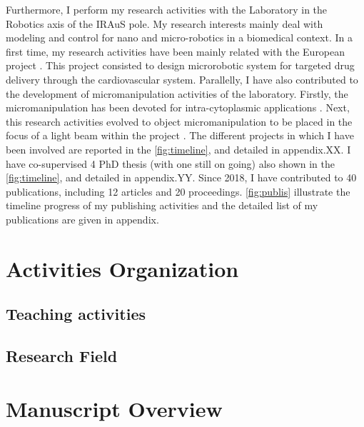 Furthermore, I perform my research activities with the \PRISMEfoot  Laboratory in the Robotics axis of the IRAuS pole.
My research interests mainly deal with modeling and control for nano and micro-robotics in a biomedical context.
In a first time, my research activities have been mainly related with the European project \NANOMAfoot.
This project consisted to design microrobotic system for targeted drug delivery through the cardiovascular system.
Parallelly, I have also contributed to the development of micromanipulation activities of the laboratory.
Firstly, the micromanipulation has been devoted for intra-cytoplasmic applications \cite{2011_icra_kim,2012_tase_kim}.
Next, this research activities evolved to object micromanipulation to be placed in the focus of a light beam within the \ANRfoot project \PIANHOfoot.
The different projects in which I have been involved are reported in the \autoref{fig:timeline}, and detailed in appendix\;\RefAnnexeCV.XX.
I have co-supervised 4 PhD thesis (with one still on going) also shown in the \autoref{fig:timeline}, and detailed in appendix\;\RefAnnexeCV.YY.
Since 2018, I have contributed to 40 publications, including 12 articles and 20 proceedings.
\autoref{fig:publis} illustrate the timeline progress of my publishing activities and the detailed list of my publications are given in appendix\;\RefAnnexeRef. 



\section{Activities Organization}\label{sec:activities}

\subsection{Teaching activities}\label{sec:teaching}
\subsection{Research Field}\label{sec:research}


\section{Manuscript Overview}\label{sec:org}
